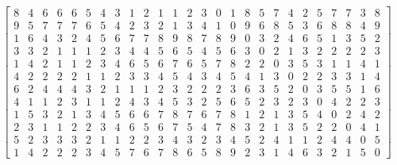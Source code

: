 \documentclass[12pt]{article}
\numberwithin{equation}{section}
\begin{document}
\[\begin{bmatrix}
8 & 4 & 6 & 6 & 6 & 5 & 4 & 3 & 1 & 2 & 1 & 1 & 2 & 3 & 0 & 1 & 8 & 5 & 7 & 4 & 2 & 5 & 7 & 7 & 3 & 8 \\
9 & 5 & 7 & 7 & 7 & 6 & 5 & 4 & 2 & 3 & 2 & 1 & 3 & 4 & 1 & 0 & 9 & 6 & 8 & 5 & 3 & 6 & 8 & 8 & 4 & 9 \\
1 & 6 & 4 & 3 & 2 & 4 & 5 & 6 & 7 & 7 & 8 & 9 & 8 & 7 & 8 & 9 & 0 & 3 & 2 & 4 & 6 & 5 & 1 & 3 & 5 & 2 \\
3 & 3 & 2 & 1 & 1 & 1 & 2 & 3 & 4 & 4 & 5 & 6 & 5 & 4 & 5 & 6 & 3 & 0 & 2 & 1 & 3 & 2 & 2 & 2 & 2 & 3 \\
1 & 4 & 2 & 1 & 1 & 2 & 3 & 4 & 6 & 5 & 6 & 7 & 6 & 5 & 7 & 8 & 2 & 2 & 0 & 3 & 5 & 3 & 1 & 1 & 4 & 1 \\
4 & 2 & 2 & 2 & 2 & 1 & 1 & 2 & 3 & 3 & 4 & 5 & 4 & 3 & 4 & 5 & 4 & 1 & 3 & 0 & 2 & 2 & 3 & 3 & 1 & 4 \\
6 & 2 & 4 & 4 & 4 & 3 & 2 & 1 & 1 & 1 & 2 & 3 & 2 & 2 & 2 & 3 & 6 & 3 & 5 & 2 & 0 & 3 & 5 & 5 & 1 & 6 \\
4 & 1 & 1 & 2 & 3 & 1 & 1 & 2 & 4 & 3 & 4 & 5 & 3 & 2 & 5 & 6 & 5 & 2 & 3 & 2 & 3 & 0 & 4 & 2 & 2 & 3 \\
1 & 5 & 3 & 2 & 1 & 3 & 4 & 5 & 6 & 6 & 7 & 8 & 7 & 6 & 7 & 8 & 1 & 2 & 1 & 3 & 5 & 4 & 0 & 2 & 4 & 2 \\
2 & 3 & 1 & 1 & 2 & 2 & 3 & 4 & 6 & 5 & 6 & 7 & 5 & 4 & 7 & 8 & 3 & 2 & 1 & 3 & 5 & 2 & 2 & 0 & 4 & 1 \\
5 & 2 & 3 & 3 & 3 & 2 & 1 & 1 & 2 & 2 & 3 & 4 & 3 & 2 & 3 & 4 & 5 & 2 & 4 & 1 & 1 & 2 & 4 & 4 & 0 & 5 \\
1 & 4 & 2 & 2 & 2 & 3 & 4 & 5 & 7 & 6 & 7 & 8 & 6 & 5 & 8 & 9 & 2 & 3 & 1 & 4 & 6 & 3 & 2 & 1 & 5 & 0
\end{bmatrix}
\]
\end{document}

